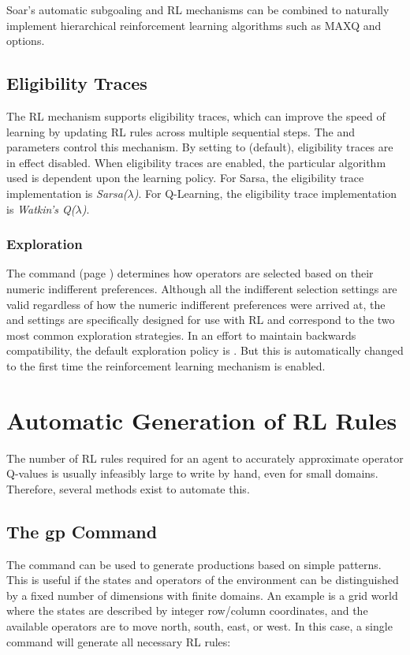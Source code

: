 Soar's automatic subgoaling and RL mechanisms can be combined to naturally implement hierarchical reinforcement learning algorithms such as MAXQ and options.

\subsection{Eligibility Traces}
\label{RL-et}
The RL mechanism supports eligibility traces, which can improve the speed of learning by updating RL rules across multiple sequential steps.
The  and  parameters control this mechanism.
By setting  to  (default), eligibility traces are in effect disabled.
When eligibility traces are enabled, the particular algorithm used is dependent upon the learning policy.
For Sarsa, the eligibility trace implementation is \emph{Sarsa($\lambda$)}. 
For Q-Learning, the eligibility trace implementation is \emph{Watkin's Q($\lambda$)}.

\subsubsection{Exploration}

The  command (page \pageref{indifferent-selection}) determines how operators are selected based on their numeric indifferent preferences.
Although all the indifferent selection settings are valid regardless of how the numeric indifferent preferences were arrived at, the  and  settings are specifically designed for use with RL and correspond to the two most common exploration strategies.
In an effort to maintain backwards compatibility, the default exploration policy is .
But this is automatically changed to  the first time the reinforcement learning mechanism is enabled.

\section{Automatic Generation of RL Rules}

The number of RL rules required for an agent to accurately approximate operator Q-values is usually infeasibly large to write by hand, even for small domains.
Therefore, several methods exist to automate this.

\subsection{The gp Command}
The  command can be used to generate productions based on simple patterns.
This is useful if the states and operators of the environment can be distinguished by a fixed number of dimensions with finite domains.
An example is a grid world where the states are described by integer row/column coordinates, and the available operators are to move north, south, east, or west.
In this case, a single  command will generate all necessary RL rules:
	
